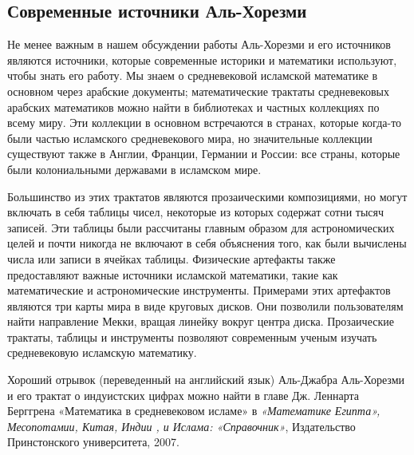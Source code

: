 \subsection{Современные источники Аль-Хорезми}
Не менее важным в нашем обсуждении работы Аль-Хорезми и его источников являются источники, которые современные историки и математики используют, чтобы знать его работу. Мы знаем о средневековой исламской математике в основном через арабские документы; математические трактаты средневековых арабских математиков можно найти в библиотеках и частных коллекциях по всему миру. Эти коллекции в основном встречаются в странах, которые когда-то были частью исламского средневекового мира, но значительные коллекции существуют также в Англии, Франции, Германии и России: все страны, которые были колониальными державами в исламском мире.

Большинство из этих трактатов являются прозаическими композициями, но могут включать в себя таблицы чисел, некоторые из которых содержат сотни тысяч записей. Эти таблицы были рассчитаны главным образом для астрономических целей и почти никогда не включают в себя объяснения того, как были вычислены числа или записи в ячейках таблицы. Физические артефакты также предоставляют важные источники исламской математики, такие как математические и астрономические инструменты. Примерами этих артефактов являются три карты мира в виде круговых дисков. Они позволили пользователям найти направление Мекки, вращая линейку вокруг центра диска. Прозаические трактаты, таблицы и инструменты позволяют современным ученым изучать средневековую исламскую математику.

Хороший отрывок (переведенный на английский язык) Аль-Джабра Аль-Хорезми и его трактат о индуистских цифрах можно найти в главе Дж. Леннарта Берггрена «Математика в средневековом исламе» в \textit{«Математике Египта», Месопотамии, Китая, Индии , и Ислама: «Справочник»}, Издательство Принстонского университета, 2007.

